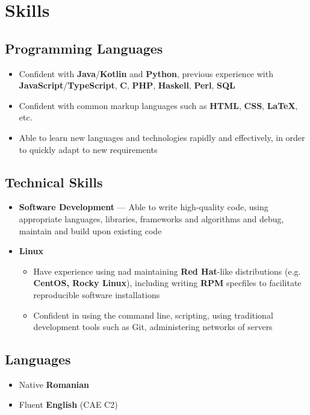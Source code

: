 \documentclass[a4paper]{article}
\begin{document}
\section*{Skills}

\subsection*{Programming Languages}
\begin{itemize}
	\item Confident with \textbf{Java}/\textbf{Kotlin} and \textbf{Python},
	previous experience with \textbf{JavaScript}/\textbf{TypeScript}, \textbf{C},
	\textbf{PHP}, \textbf{Haskell}, \textbf{Perl}, \textbf{SQL}
	\item Confident with common markup languages such as \textbf{HTML},
	      \textbf{CSS}, \textbf{{\LaTeX}}, etc.
	\item Able to learn new languages and technologies rapidly and effectively,
	      in order to quickly adapt to new requirements
\end{itemize}

\subsection*{Technical Skills}
\begin{itemize}
	\item \textbf{Software Development} --- Able to write high-quality code, using
	      appropriate languages, libraries, frameworks and algorithms and debug,
	      maintain and build upon existing code
	\item \textbf{Linux}

	\begin{itemize}
		\item Have experience using nad maintaining \textbf{Red Hat}-like distributions (e.g.
		\textbf{CentOS, Rocky Linux}), including writing \textbf{RPM} specfiles to facilitate
		reproducible software installations
		\item Confident in using the command line, scripting, using traditional development
		tools such as Git, administering networks of servers
	\end{itemize}
\end{itemize}

\subsection*{Languages}
\begin{itemize}
	\item Native \textbf{Romanian}
	\item Fluent \textbf{English} (CAE C2)
\end{itemize}
\end{document}

